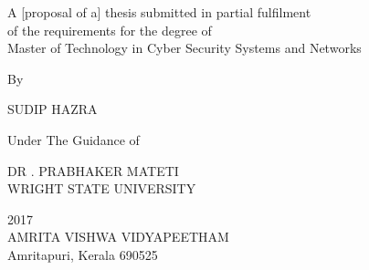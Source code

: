 \thispagestyle{empty}
\begin{center}

{\bf\Huge \thesisTitle}

\par\vskip 4cm

A  [proposal of a] thesis submitted in partial fulfilment\\
of the requirements for the degree of\\
Master of Technology in Cyber Security Systems and Networks\\  %

\par\vskip 2cm
By\\
\par\vskip 2cm


SUDIP HAZRA\\
\par\vskip 1cm
Under The Guidance of\\
\par\vskip 1cm
DR . PRABHAKER MATETI\\
WRIGHT STATE UNIVERSITY \\       %


\vfill

2017\\                          %
AMRITA VISHWA VIDYAPEETHAM\\
Amritapuri, Kerala 690525\\


\end{center}

\newpage

